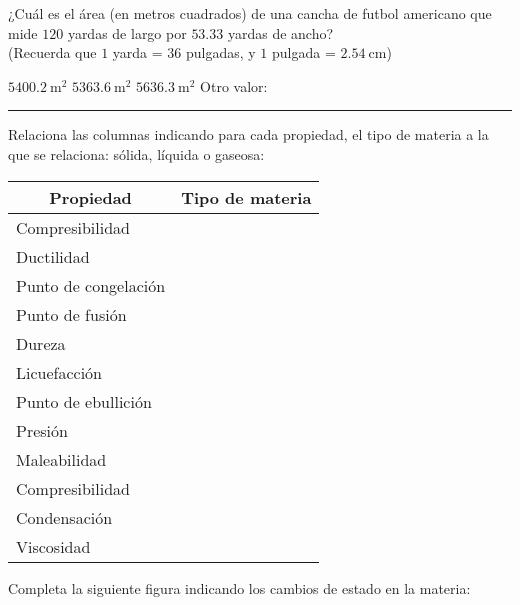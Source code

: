 \documentclass[14pt]{exam}
\begin{document}
\begin{questions}
    \question ¿Cuál es el área (en metros cuadrados) de una cancha de futbol americano que mide $120$ yardas de largo por $53.33$ yardas de ancho? \\[0.5em]
    (Recuerda que $1$ yarda = $36$ pulgadas, y $1$ pulgada = $\SI{2.54}{\centi\meter}$)
    \\[0.5em]
    \begin{oneparchoices}
        \choice $\SI{5400.2}{\square\meter}$
        \choice $\SI{5363.6}{\square\meter}$
        \choice $\SI{5636.3}{\square\meter}$
        \choice Otro valor: \rule{3cm}{0.1mm}
    \end{oneparchoices}
    \question Relaciona las columnas indicando para cada propiedad, el tipo de materia a la que se relaciona: sólida, líquida o gaseosa:
    \begin{table}[H]
        \renewcommand{\arraystretch}{1.2}
        \centering
        \begin{tabular}{l | l}
            \multicolumn{1}{c}{\textbf{Propiedad}} & \multicolumn{1}{|c}{\textbf{Tipo de materia}} \\ \hline
            Compresibilidad & \\ \hline
            Ductilidad & \\ \hline
            Punto de congelación & \\ \hline
            Punto de fusión & \\ \hline
            Dureza & \\ \hline
            Licuefacción & \\ \hline
            Punto de ebullición & \\ \hline
            Presión & \\ \hline
            Maleabilidad & \\ \hline
            Compresibilidad & \\ \hline
            Condensación & \\ \hline
            Viscosidad & \\ \hline
        \end{tabular}
    \end{table}
    \newpage
    \question Completa la siguiente figura indicando los cambios de estado en la materia:
    \begin{figure}[H]
        \centering
    \end{figure}
\end{questions}
\end{document}
